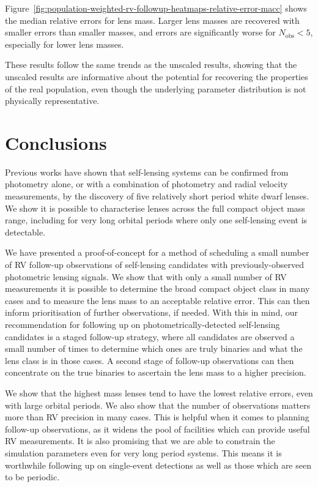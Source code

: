 \documentclass[fleqn,usenatbib]{mnras}
\begin{document}
Figure~\ref{fig:population-weighted-rv-followup-heatmaps-relative-error-macc} shows the median relative errors for lens mass. Larger lens masses are recovered with smaller errors than smaller masses, and errors are significantly worse for $N_\mathrm{obs} < 5$, especially for lower lens masses.

These results follow the same trends as the unscaled results, showing that the unscaled results are informative about the potential for recovering the properties of the real population, even though the underlying parameter distribution is not physically representative.

\clearpage
\clearpage
\section{Conclusions} \label{sec:conclusions}
Previous works have shown that self-lensing systems can be confirmed from photometry alone, or with a combination of photometry and radial velocity measurements, by the discovery of five relatively short period white dwarf lenses. We show it is possible to characterise lenses across the full compact object mass range, including for very long orbital periods where only one self-lensing event is detectable.

We have presented a proof-of-concept for a method of scheduling a small number of RV follow-up observations of self-lensing candidates with previously-observed photometric lensing signals. We show that with only a small number of RV measurements it is possible to determine the broad compact object class in many cases and to measure the lens mass to an acceptable relative error. This can then inform prioritisation of further observations, if needed. With this in mind, our recommendation for following up on photometrically-detected self-lensing candidates is a staged follow-up strategy, where all candidates are observed a small number of times to determine which ones are truly binaries and what the lens class is in those cases. A second stage of follow-up observations can then concentrate on the true binaries to ascertain the lens mass to a higher precision.

We show that the highest mass lenses tend to have the lowest relative errors, even with large orbital periods. We also show that the number of observations matters more than RV precision in many cases. This is helpful when it comes to planning follow-up observations, as it widens the pool of facilities which can provide useful RV measurements. It is also promising that we are able to constrain the simulation parameters even for very long period systems. This means it is worthwhile following up on single-event detections as well as those which are seen to be periodic.
\end{document}
